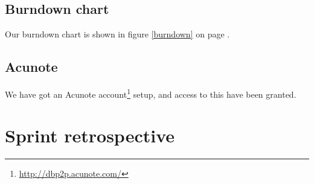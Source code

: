 \documentclass[a4paper,11pt]{article}
\begin{document}
\subsection{Burndown chart}

Our burndown chart is shown in figure \ref{burndown} on page \pageref{burndown}.


\subsection{Acunote}
We have got an Acunote account\footnote{\url{http://dbp2p.acunote.com/}} setup, and access to this have been granted.

\clearpage


\section{Sprint retrospective}
\end{document}
